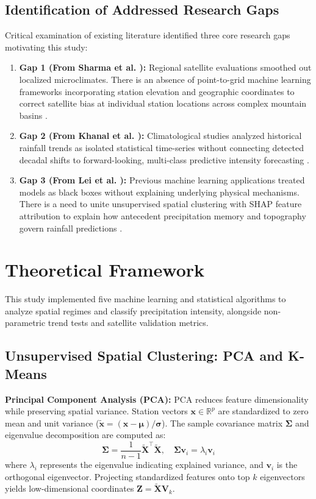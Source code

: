 \documentclass[conference]{IEEEtran}
\begin{document}
\subsection{Identification of Addressed Research Gaps}
Critical examination of existing literature identified three core research gaps motivating this study:
\begin{enumerate}
    \item \textbf{Gap 1 (From Sharma et al. \cite{sharma2020}):} Regional satellite evaluations smoothed out localized microclimates. There is an absence of point-to-grid machine learning frameworks incorporating station elevation and geographic coordinates to correct satellite bias at individual station locations across complex mountain basins \cite{karki2017}.
    \item \textbf{Gap 2 (From Khanal et al. \cite{khanal2024}):} Climatological studies analyzed historical rainfall trends as isolated statistical time-series without connecting detected decadal shifts to forward-looking, multi-class predictive intensity forecasting \cite{zhu2023, callau2023}.
    \item \textbf{Gap 3 (From Lei et al. \cite{lei2025}):} Previous machine learning applications treated models as black boxes without explaining underlying physical mechanisms. There is a need to unite unsupervised spatial clustering with SHAP feature attribution to explain how antecedent precipitation memory and topography govern rainfall predictions \cite{he2009, talchabhadel2021}.
\end{enumerate}


\section{Theoretical Framework}
\label{sec:theory}
This study implemented five machine learning and statistical algorithms to analyze spatial regimes and classify precipitation intensity, alongside non-parametric trend tests and satellite validation metrics.

\subsection{Unsupervised Spatial Clustering: PCA and K-Means}
\textbf{Principal Component Analysis (PCA):} PCA reduces feature dimensionality while preserving spatial variance. Station vectors $\mathbf{x} \in \mathbb{R}^p$ are standardized to zero mean and unit variance ($\tilde{\mathbf{x}} = (\mathbf{x} - \boldsymbol{\mu}) / \boldsymbol{\sigma}$). The sample covariance matrix $\mathbf{\Sigma}$ and eigenvalue decomposition are computed as:
\begin{equation}
\mathbf{\Sigma} = \frac{1}{n-1} \tilde{\mathbf{X}}^\top \tilde{\mathbf{X}}, \quad \mathbf{\Sigma}\mathbf{v}_i = \lambda_i \mathbf{v}_i
\label{eq:pca_cov}
\end{equation}
where $\lambda_i$ represents the eigenvalue indicating explained variance, and $\mathbf{v}_i$ is the orthogonal eigenvector. Projecting standardized features onto top $k$ eigenvectors yields low-dimensional coordinates $\mathbf{Z} = \tilde{\mathbf{X}}\mathbf{V}_k$.
\end{document}

